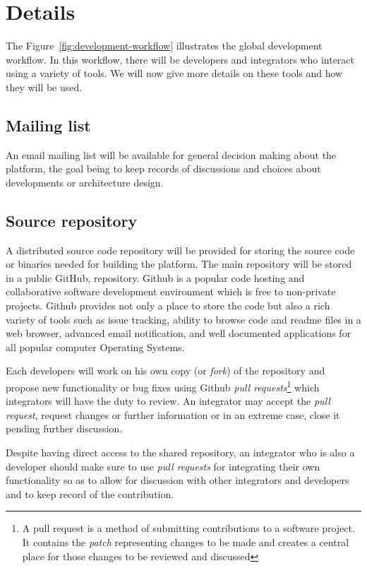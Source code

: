 \documentclass{learnpad}
\begin{document}
\section{Details}
\label{sec:details}

The Figure~\ref{fig:development-workflow} illustrates the global development workflow.
In this workflow, there will be developers and integrators who interact using a variety of tools.
We will now give more details on these tools and how they will be used.

\subsection{Mailing list}
\label{sec:mailing-list}

An email mailing list will be available for general decision making about the platform,
the goal being to keep records of discussions and choices about developments or architecture design.

\subsection{Source repository}
\label{sec:source-repository}

A distributed source code repository will be provided for storing the source code or binaries
needed for building the \learnpad platform. The main repository will be stored in a public GitHub,
repository. Github is a popular code hosting and collaborative software development environment
which is free to non-private projects. Github provides not only a place to store the code but also
a rich variety of tools such as issue tracking, ability to browse code and readme files in a web
browser, advanced email notification, and well documented applications for all popular computer
Operating Systems.

Each developers will work on his own copy (or \emph{fork}) of the repository and propose new
functionality or bug fixes using Github \emph{pull requests}\footnote{A pull request is a method of
submitting contributions to a software project. It contains the \emph{patch} representing changes to
be made and creates a central place for those changes to be reviewed and discussed} which
integrators will have the duty to review. An integrator may accept the \emph{pull request},
request changes or further information or in an extreme case, close it pending further discussion.

Despite having direct access to the shared repository, an integrator who is also a developer should
make sure to use \emph{pull requests} for integrating their own functionality so as to allow for
discussion with other integrators and developers and to keep record of the contribution.
\end{document}
